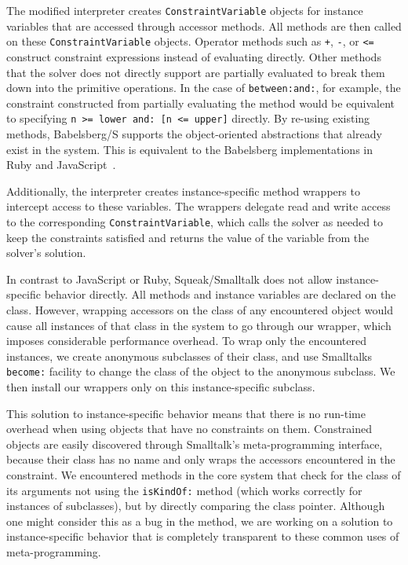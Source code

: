 The modified interpreter creates \texttt{ConstraintVariable} objects
for instance variables that are accessed through accessor methods. All
methods are then called on these \texttt{ConstraintVariable}
objects. Operator methods such as \lstinline{+}, \lstinline{-}, or
\lstinline!<=!  construct constraint expressions instead of evaluating
directly. Other methods that the solver does not directly support are
partially evaluated to break them down into the primitive
operations. In the case of \lstinline!between:and:!, for example, the
constraint constructed from partially evaluating the method would be
equivalent to specifying \lstinline!n >= lower and: [n <= upper]!
directly. By re-using existing methods, Babelsberg/S supports the
object-oriented abstractions that already exist in the system. This is
equivalent to the Babelsberg implementations in Ruby and
JavaScript~\cite{felgentreff2014jot}.

Additionally, the interpreter creates instance-specific method
wrappers to intercept access to these variables. The wrappers delegate
read and write access to the corresponding
\texttt{ConstraintVariable}, which calls the solver as needed to keep
the constraints satisfied and returns the value of the variable from
the solver's solution.

In contrast to JavaScript or Ruby, Squeak/Smalltalk does not allow
instance-specific behavior directly. All methods and instance
variables are declared on the class. However, wrapping accessors on
the class of any encountered object would cause all instances of that
class in the system to go through our wrapper, which imposes
considerable performance overhead. To wrap only the encountered
instances, we create anonymous subclasses of their class, and use
Smalltalks \lstinline!become:! facility to change the class of the
object to the anonymous subclass. We then install our wrappers only on
this instance-specific subclass.

This solution to instance-specific behavior means that there is no
run-time overhead when using objects that have no constraints on
them. Constrained objects are easily discovered through Smalltalk's
meta-programming interface, because their class has no name and only
wraps the accessors encountered in the constraint. We encountered
methods in the core system that check for the class of its arguments
not using the \lstinline!isKindOf:! method (which works correctly for
instances of subclasses), but by directly comparing the class
pointer. Although one might consider this as a bug in the method, we
are working on a solution to instance-specific behavior that is
completely transparent to these common uses of meta-programming.

